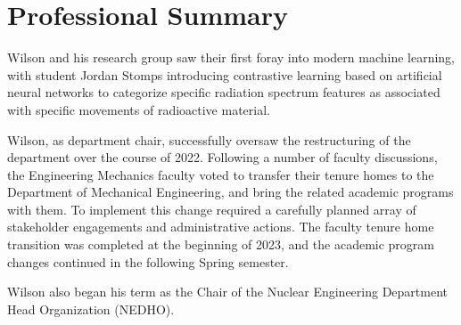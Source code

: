 \section{Professional Summary}

Wilson and his research group saw their first foray into modern machine
learning, with student Jordan Stomps introducing contrastive learning based
on artificial neural networks to categorize specific radiation spectrum
features as associated with specific movements of radioactive material.

Wilson, as department chair, successfully oversaw the restructuring of the
department over the course of 2022. Following a number of faculty discussions,
the Engineering Mechanics faculty voted to transfer their tenure homes to the
Department of Mechanical Engineering, and bring the related academic programs
with them. To implement this change required a carefully planned array of
stakeholder engagements and administrative actions. The faculty tenure home
transition was completed at the beginning of 2023, and the academic program
changes continued in the following Spring semester.

Wilson also began his term as the Chair of the Nuclear Engineering Department
Head Organization (NEDHO).